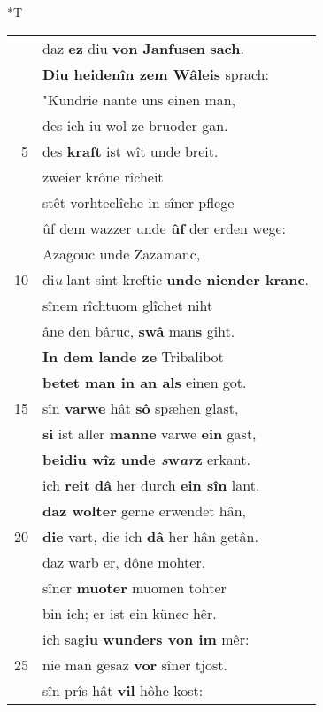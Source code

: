 \documentclass[8pt,a4paper,notitlepage]{article}
\begin{document}
\begin{table}[ht]
\begin{minipage}[t]{0.5\linewidth}
\end{minipage}
\hspace{0.5cm}
\begin{minipage}[t]{0.5\linewidth}
\small
\begin{center}*T
\end{center}
\begin{tabular}{rl}
 & daz \textbf{ez} diu \textbf{von Janfusen} \textbf{sach}.\\ 
 & \textbf{Diu heidenîn zem Wâleis} sprach:\\ 
 & "Kundrie nante uns einen man,\\ 
 & des ich iu wol ze bruoder gan.\\ 
5 & des \textbf{kraft} ist wît unde breit.\\ 
 & zweier krône rîcheit\\ 
 & stêt vorhteclîche in sîner pflege\\ 
 & ûf dem wazzer unde \textbf{ûf} der erden wege:\\ 
 & Azagouc unde Zazamanc,\\ 
10 & di\textit{u} lant sint kreftic \textbf{unde niender kranc}.\\ 
 & sînem rîchtuom glîchet niht\\ 
 & âne den bâruc, \textbf{swâ} man\textbf{s} giht.\\ 
 & \textbf{In dem lande ze} Tribalibot\\ 
 & \textbf{betet man in an als} einen got.\\ 
15 & sîn \textbf{varwe} hât \textbf{sô} spæhen glast,\\ 
 & \textbf{si} ist aller \textbf{manne} varwe \textbf{ein} gast,\\ 
 & \textbf{beidiu wîz unde \textit{s}w\textit{ar}z} erkant.\\ 
 & ich \textbf{reit} \textbf{dâ} her durch \textbf{ein sîn} lant.\\ 
 & \textbf{daz wolter} gerne erwendet hân,\\ 
20 & \textbf{die} vart, die ich \textbf{dâ} her hân getân.\\ 
 & daz warb er, dône mohter.\\ 
 & sîner \textbf{muoter} muomen tohter\\ 
 & bin ich; er ist ein künec hêr.\\ 
 & ich sag\textbf{iu} \textbf{wunders von im} mêr:\\ 
25 & nie man gesaz \textbf{vor} sîner tjost.\\ 
 & sîn prîs hât \textbf{vil} hôhe kost:\\ 

\end{tabular}
\end{minipage}
\end{table}
\end{document}
